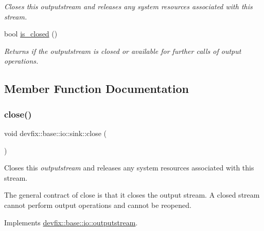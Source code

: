 \begin{DoxyCompactItemize}
\begin{DoxyCompactList}\small\item\em Closes this {\itshape outputstream} and releases any system resources associated with this stream. \end{DoxyCompactList}\item 
bool \hyperlink{structdevfix_1_1base_1_1io_1_1sink_a1e5782219f9256d8ff09385fa6f3b156}{is\+\_\+closed} ()
\begin{DoxyCompactList}\small\item\em Returns if the {\itshape outputstream} is closed or available for further calls of output operations. \end{DoxyCompactList}\end{DoxyCompactItemize}


\subsection{Member Function Documentation}
\mbox{\label{structdevfix_1_1base_1_1io_1_1sink_a2d110d27baa88f462540e7fd59fb8b3c}} 
\subsubsection{\texorpdfstring{close()}{close()}}
{\footnotesize\ttfamily void devfix\+::base\+::io\+::sink\+::close (\begin{DoxyParamCaption}{ }\end{DoxyParamCaption})\hspace{0.3cm}{\ttfamily [virtual]}}



Closes this {\itshape outputstream} and releases any system resources associated with this stream. 

The general contract of close is that it closes the output stream. A closed stream cannot perform output operations and cannot be reopened. 

Implements \hyperlink{structdevfix_1_1base_1_1io_1_1outputstream_a060c2e7040e6bb831b8150f64bd8abf7}{devfix\+::base\+::io\+::outputstream}.

\mbox{\label{structdevfix_1_1base_1_1io_1_1sink_abf208747c9be8295972fbc4696ddc557}} 
